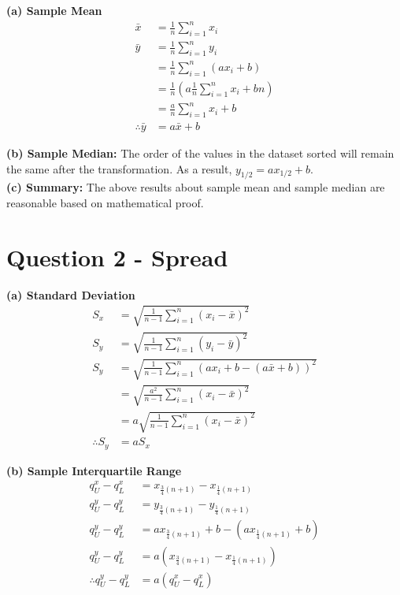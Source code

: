 \documentclass[
]{book}
\begin{document}
\textbf{(a) Sample Mean}
\[\begin{aligned}
\bar{x} &= \frac{1}{n} \sum_{i=1}^{n} x_i \\
\bar{y} & =\frac{1}{n} \sum_{i=1}^{n} y_i \\
         &=\frac{1}{n} \sum_{i=1}^{n} (ax_i + b) \\
         &=\frac{1}{n}(a\frac{1}{n} \sum_{i=1}^{n} x_i + bn) \\
         &=\frac{a}{n} \sum_{i=1}^{n} x_i + b \\
\therefore \bar{y} &= a\bar{x} + b
\end{aligned}\]

\textbf{(b) Sample Median: } The order of the values in the dataset sorted will remain the same after the transformation. As a result, \(y_{1/2} = ax_{1/2} + b\).\\
\textbf{(c) Summary: } The above results about sample mean and sample median are reasonable based on mathematical proof.

\section{Question 2 - Spread}\label{question-2---spread}

\textbf{(a) Standard Deviation}
\[\begin{aligned}
S_x &= \sqrt{\frac{1}{n-1} \sum_{i=1}^{n} (x_i - \bar{x})^2} \\
S_y &= \sqrt{\frac{1}{n-1} \sum_{i=1}^{n} (y_i - \bar{y})^2} \\
S_y &= \sqrt{\frac{1}{n-1} \sum_{i=1}^{n} (ax_i + b - (a\bar{x} + b))^2} \\
    &= \sqrt{\frac{a^2}{n-1} \sum_{i=1}^{n} (x_i - \bar{x})^2} \\
    &= a \sqrt{\frac{1}{n-1} \sum_{i=1}^{n} (x_i - \bar{x})^2} \\
\therefore S_y &= a S_x 
\end{aligned}\]

\textbf{(b) Sample Interquartile Range}
\[\begin{aligned} 
q_U^x - q_L^x &= x_{\frac{3}{4}(n+1)} - x_{\frac{1}{4}(n+1)} \\
q_U^y - q_L^y &= y_{\frac{3}{4}(n+1)} - y_{\frac{1}{4}(n+1)} \\
q_U^y - q_L^y &= ax_{\frac{3}{4}(n+1)} + b - (ax_{\frac{1}{4}(n+1)} + b) \\
q_U^y - q_L^y &= a(x_{\frac{3}{4}(n+1)} - x_{\frac{1}{4}(n+1)}) \\
\therefore q_U^y - q_L^y &= a(q_U^x - q_L^x)
\end{aligned}\]
\end{document}
